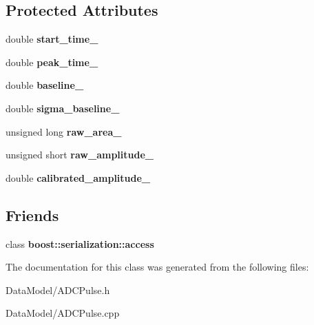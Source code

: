 \subsection*{Protected Attributes}
\begin{DoxyCompactItemize}
\item 
\hypertarget{classADCPulse_af93ef20fa02d9ea44a7b84d32c8b029f}{
double {\bfseries start\_\-time\_\-}}
\label{classADCPulse_af93ef20fa02d9ea44a7b84d32c8b029f}

\item 
\hypertarget{classADCPulse_a4e87f35bcc0f597f6e3c3e73d0b4312b}{
double {\bfseries peak\_\-time\_\-}}
\label{classADCPulse_a4e87f35bcc0f597f6e3c3e73d0b4312b}

\item 
\hypertarget{classADCPulse_ab355ff3d438597f659f899e14e9ce37a}{
double {\bfseries baseline\_\-}}
\label{classADCPulse_ab355ff3d438597f659f899e14e9ce37a}

\item 
\hypertarget{classADCPulse_a97eddbc21ba72324520405c64288693e}{
double {\bfseries sigma\_\-baseline\_\-}}
\label{classADCPulse_a97eddbc21ba72324520405c64288693e}

\item 
\hypertarget{classADCPulse_ae665395493e477287e366b9d8772996d}{
unsigned long {\bfseries raw\_\-area\_\-}}
\label{classADCPulse_ae665395493e477287e366b9d8772996d}

\item 
\hypertarget{classADCPulse_ad77ade03d815b418fe138fd599f3db57}{
unsigned short {\bfseries raw\_\-amplitude\_\-}}
\label{classADCPulse_ad77ade03d815b418fe138fd599f3db57}

\item 
\hypertarget{classADCPulse_ae68ae047968f1257b4aa0ad9bfd08847}{
double {\bfseries calibrated\_\-amplitude\_\-}}
\label{classADCPulse_ae68ae047968f1257b4aa0ad9bfd08847}

\end{DoxyCompactItemize}
\subsection*{Friends}
\begin{DoxyCompactItemize}
\item 
\hypertarget{classADCPulse_ac98d07dd8f7b70e16ccb9a01abf56b9c}{
class {\bfseries boost::serialization::access}}
\label{classADCPulse_ac98d07dd8f7b70e16ccb9a01abf56b9c}

\end{DoxyCompactItemize}


The documentation for this class was generated from the following files:\begin{DoxyCompactItemize}
\item 
DataModel/ADCPulse.h\item 
DataModel/ADCPulse.cpp\end{DoxyCompactItemize}
